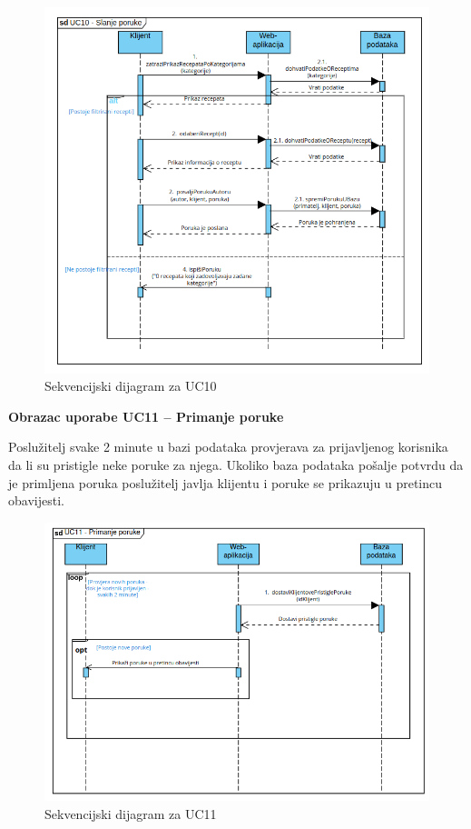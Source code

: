 				\begin{figure}[H]
					\includegraphics[scale=0.6]{dijagrami/SD10.png} 
					\centering
					\caption{Sekvencijski dijagram za UC10}
					\label{fig:sd10}
				\end{figure}		
				\eject 

				\textbf{Obrazac uporabe UC11 – Primanje poruke}

				Poslužitelj svake 2 minute u bazi podataka provjerava za prijavljenog 
				korisnika da li su pristigle neke poruke za njega. Ukoliko baza podataka 
				pošalje potvrdu da je primljena poruka poslužitelj javlja klijentu i 
				poruke se prikazuju u pretincu obavijesti.

				\begin{figure}[H]
					\includegraphics[scale=0.6]{dijagrami/SD11.png} 
					\centering
					\caption{Sekvencijski dijagram za UC11}
					\label{fig:sd11}
				\end{figure}		
				\eject 

